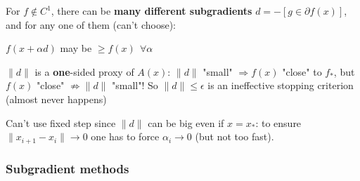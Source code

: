 \documentclass[10pt]{report}
\begin{document}
For $f\not\in C^1$, there can be \textbf{many different subgradients} $d = -[g\in\partial f(x)]$, and for any one of them (can't choose):
\begin{list}{}{}
	\item $f(x+\alpha d)$ may be $\geq f(x)\:\:\forall\alpha$
	\item $\|d\|$ is a \textbf{one}-sided proxy of $A(x)$: $\|d\|$ "small" $\Rightarrow f(x)$ "close" to $f_*$, but $f(x)$ "close" $\not\Rightarrow \|d\|$ "small"! So $\|d\|\leq \epsilon$ is an ineffective stopping criterion (almost never happens)
	\item Can't use fixed step since $\|d\|$ can be big even if $x = x_*$: to ensure $\|x_{i+1}-x_i\|\rightarrow 0$ one has to force $\alpha_i\rightarrow 0$ (but not too fast).
\end{list}
\subsubsection{Subgradient methods}
\end{document}
